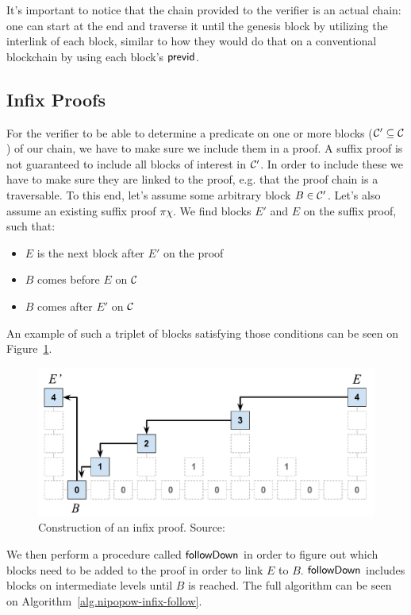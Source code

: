 It's important to notice that the chain provided to the verifier is an actual chain: one can start at the end and traverse it until the genesis block by utilizing the interlink of each block, similar to how they would do that on a conventional blockchain by using each block's $\sf previd$.

\subsection{Infix Proofs}
\label{ssec:infix}
For the verifier to be able to determine a predicate on one or more blocks ($\mathcal{C}' \subseteq \mathcal{C}$) of our chain, we have to make sure we include them in a proof. A suffix proof is not guaranteed to include all blocks of interest in $\mathcal{C}'$. In order to include these we have to make sure they are linked to the proof, e.g. that the proof chain is a traversable. To this end, let's assume some arbitrary block $B \in \mathcal{C}'$. Let's also assume an existing suffix proof $\pi\chi$. We find blocks $E'$ and $E$ on the suffix proof, such that:

\begin{itemize}
  \item $E$ is the next block after $E'$ on the proof
  \item $B$ comes before $E$ on $\mathcal{C}$
  \item $B$ comes after $E'$ on $\mathcal{C}$
\end{itemize}

An example of such a triplet of blocks satisfying those conditions can be seen on Figure~\ref{fig:infix-proof}.

\begin{figure}
  \centering
  \includegraphics[width=0.9\columnwidth,keepaspectratio]{figures/infix.pdf}
  \caption{Construction of an infix proof.  Source:~\cite{nipopows}}
  \label{fig:infix-proof}
\end{figure}

We then perform a procedure called $\sf followDown$ in order to figure out which blocks need to be added to the proof in order to link $E$ to $B$. $\sf followDown$ includes blocks on intermediate levels until $B$ is reached. The full algorithm can be seen on Algorithm~\ref{alg.nipopow-infix-follow}.

